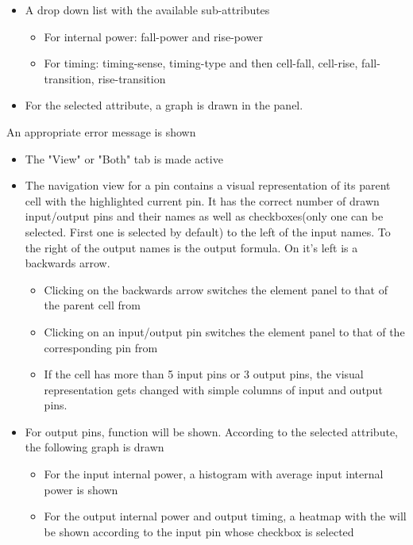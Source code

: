 \documentclass[10pt,a4paper]{report}
\begin{document}
\begin{FR}
{\begin{itemize}
\begin{itemize}
            \end{itemize}
            \item A drop down list with the available sub-attributes
            \begin{itemize}
                \item For internal power: fall-power and rise-power
                \item For timing: timing-sense, timing-type and then cell-fall, cell-rise, fall-transition, rise-transition
            \end{itemize}
            \item For the selected attribute, a graph is drawn in the panel.
        \end{itemize}}
    {An appropriate error message is shown}
    {\begin{itemize}
        \item The "View" or "Both" tab is made active
    \end{itemize}}
    {\begin{itemize}
        \item The navigation view for a pin contains a visual representation of its parent cell with the highlighted current pin. It has the correct number of drawn input/output pins and their names as well as checkboxes(only one can be selected. First one is selected by default) to the left of the input names. To the right of the output names is the output formula. On it's left is a backwards arrow.
        \begin{itemize}
            \item Clicking on the backwards arrow switches the element panel to that of the parent cell from \label{FR-BLABLABLA}
            \item Clicking on an input/output pin switches the element panel to that of the corresponding pin from \label{FR-BLABLABLA}
            \item If the cell has more than 5 input pins or 3 output pins, the visual representation gets changed with simple columns of input and output pins.
        \end{itemize}
        \item For output pins, function will be shown. According to the selected attribute, the following graph is drawn
        \begin{itemize}
            \item For the input internal power, a histogram with average input internal power is shown
            \item For the output internal power and output timing, a heatmap with the will be shown according to the input pin whose checkbox is selected

\end{itemize}
\end{itemize}}
\end{FR}
\end{document}
